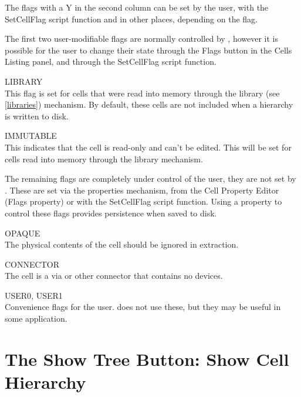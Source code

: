 The flags with a Y in the second column can be set by the user, with
the {\vt SetCellFlag} script function and in other places, depending
on the flag.

The first two user-modifiable flags are normally controlled by {\Xic},
however it is possible for the user to change their state through the
{\cb Flags} button in the {\cb Cells Listing} panel, and through the
{\vt SetCellFlag} script function.

\begin{description}
\item{\vt LIBRARY}\\
This flag is set for cells that were read into memory through the
library (see \ref{libraries}) mechanism.  By default, these cells are
not included when a hierarchy is written to disk.

\item{\vt IMMUTABLE}\\
This indicates that the cell is read-only and can't be edited.  This
will be set for cells read into memory through the library mechanism.
\end{description}

The remaining flags are completely under control of the user, they are
not set by {\Xic}.  These are set via the properties mechanism, from
the {\cb Cell Property Editor} ({\cb Flags} property) or with the {\vt
SetCellFlag} script function.  Using a property to control these flags
provides persistence when saved to disk.

\begin{description}
\item{\vt OPAQUE}\\
The physical contents of the cell should be ignored in extraction.

\item{\vt CONNECTOR}\\
The cell is a via or other connector that contains no devices.

\item{\vt
USER0}, {\vt USER1}\\
Convenience flags for the user.  {\Xic} does not use these, but they
may be useful in some application.
\end{description}

\section{The {\cb Show Tree} Button: Show Cell Hierarchy}

